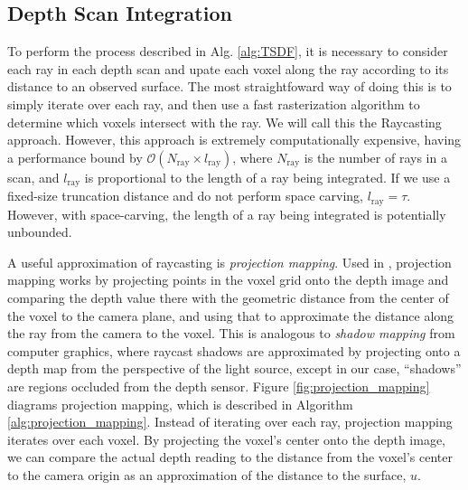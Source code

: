 \documentclass[10pt,twocolumn,letterpaper]{article}
\begin{document}
\subsection{Depth Scan Integration}
\label{section:scan_integration}
To perform the process described in Alg. \ref{alg:TSDF}, it is necessary
to consider each ray in each depth scan and upate each voxel
along the ray according to its distance to an observed surface. The most
straightfoward way of doing this is to simply iterate over each ray, and then
use a fast rasterization algorithm \cite{RayTracing} to determine which voxels
intersect with the ray. We will call this the Raycasting approach.
However, this approach is extremely computationally expensive, having a
performance bound by $\mathcal{O}(N_{\text{ray}} \times l_{\text{ray}})$, where
$N_{\text{ray}}$ is the number of rays in a scan, and $l_{\text{ray}}$  is 
proportional to the length of a ray being integrated. If we use a fixed-size
truncation distance and do not perform space carving, $l_{\text{ray}} = \tau$.
However, with space-carving, the length of a ray being integrated is
potentially unbounded.

A useful approximation of raycasting is \textit{projection mapping}. Used in
\cite{Nguyen2012, Bylow2013, Klingensmith2014}, projection mapping works by
projecting points in the voxel grid onto the depth image and comparing the depth value
there with the geometric distance from the center of the voxel to the camera
plane, and using that to approximate the distance along the ray from the camera
to the voxel. This is analogous to \textit{shadow mapping} \cite{Shadowmapping}
from computer graphics, where raycast shadows are approximated by projecting
onto a depth map from the perspective of the light source, except in our case, 
``shadows'' are regions occluded from the depth sensor.  Figure 
\ref{fig:projection_mapping} diagrams projection mapping, which is described in
Algorithm \ref{alg:projection_mapping}. Instead of iterating over each ray,
projection mapping iterates over each voxel. By projecting the voxel's center
onto the depth image, we can compare the actual depth reading to the distance
from the voxel's center to the camera origin as an approximation of the
distance to the surface, $u$. 
\end{document}
